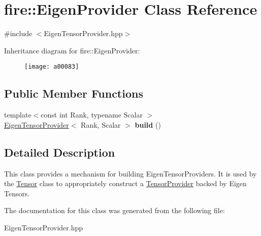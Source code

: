 \hypertarget{a00083}{}\section{fire\+:\+:Eigen\+Provider Class Reference}
\label{a00083}


{\ttfamily \#include $<$Eigen\+Tensor\+Provider.\+hpp$>$}

Inheritance diagram for fire\+:\+:Eigen\+Provider\+:\begin{figure}[H]
\begin{center}
\leavevmode
\texttt{[image: a00083]}
\end{center}
\end{figure}
\subsection*{Public Member Functions}
\begin{DoxyCompactItemize}
\item 
{\footnotesize template$<$const int Rank, typename Scalar $>$ }\\\hyperlink{a00084}{Eigen\+Tensor\+Provider}$<$ Rank, Scalar $>$ {\bfseries build} ()\hypertarget{a00083_ab9bfc7a0004ea10d57442f495c468b2e}{}\label{a00083_ab9bfc7a0004ea10d57442f495c468b2e}

\end{DoxyCompactItemize}


\subsection{Detailed Description}
This class provides a mechanism for building Eigen\+Tensor\+Providers. It is used by the \hyperlink{a00299}{Tensor} class to appropriately construct a \hyperlink{a00300}{Tensor\+Provider} backed by Eigen Tensors. 

The documentation for this class was generated from the following file\+:\begin{DoxyCompactItemize}
\item 
Eigen\+Tensor\+Provider.\+hpp\end{DoxyCompactItemize}
